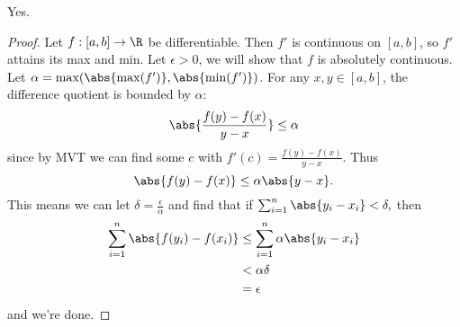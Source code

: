 \documentclass[12pt,letterpaper]{article}
\begin{document}
\vfill
\pagebreak
{}
Yes. 
\begin{proof}
Let $f:[a,b]\to\R$ be differentiable. Then $f'$ is continuous on $[a,b]$, so $f'$ attains its max and min. Let $\epsilon>0$, we will show that $f$ is absolutely continuous. Let $\alpha=\max(\abs{\max(f')}, \abs{\min(f')})$. For any $x,y\in[a,b]$, the difference quotient is bounded by $\alpha$:
$$\abs{\frac{f(y)-f(x)}{y-x}}\leq\alpha$$
since by MVT we can find some $c$ with $f'(c)=\frac{f(y)-f(x)}{y-x}$. Thus 
$$\abs{f(y)-f(x)}\leq\alpha\abs{y-x}.$$ 
This means we can let $\delta=\frac{\epsilon}{\alpha}$ and find that if $\sum_{i=1}^n\abs{y_i-x_i}<\delta,$ then 
\begin{align*}
\sum_{i=1}^n\abs{f(y_i)-f(x_i)}&\leq\sum_{i=1}^n\alpha\abs{y_i-x_i} \\
&< \alpha\delta \\
&= \epsilon
\end{align*}
and we're done.
\end{proof}
\end{document}
